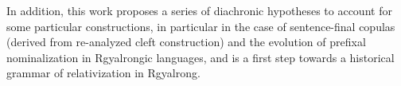 \documentclass[oldfontcommands,oneside,a4paper,11pt]{article}
\begin{document}
 In addition, this work proposes a series of diachronic hypotheses to account for some particular constructions, in particular in the case of sentence-final copulas (derived from re-analyzed cleft construction) and the evolution of prefixal nominalization in Rgyalrongic languages, and is a first step towards a historical grammar of relativization in Rgyalrong.



\end{document}
